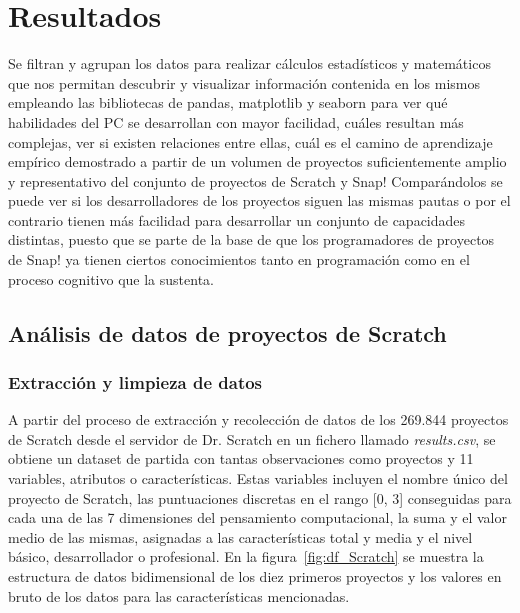 \documentclass[a4paper, 12pt]{book}
\begin{document}

\cleardoublepage
\chapter{Resultados}
\label{chap:resultados}

Se filtran y agrupan los datos para realizar cálculos estadísticos y matemáticos que nos permitan descubrir y visualizar información contenida en los mismos empleando las bibliotecas de pandas, matplotlib y seaborn para ver qué habilidades del PC se desarrollan con mayor facilidad, cuáles resultan más complejas, ver si existen relaciones entre ellas, cuál es el camino de aprendizaje empírico demostrado a partir de un volumen de proyectos suficientemente amplio y representativo del conjunto de proyectos de Scratch y Snap! Comparándolos se puede ver si los desarrolladores de los proyectos siguen las mismas pautas o por el contrario tienen más facilidad para desarrollar un conjunto de capacidades distintas, puesto que se parte de la base de que los programadores de proyectos de Snap! ya tienen ciertos conocimientos tanto en programación como en el proceso cognitivo que la sustenta.

\section{Análisis de datos de proyectos de Scratch} 
\label{sec:result_scratch}

\subsection{Extracción y limpieza de datos}
\label{subsec:clean_data_Scratch}

A partir del proceso de extracción y recolección de datos de los 269.844 proyectos de Scratch desde el servidor de Dr. Scratch en un fichero llamado \emph{results.csv}, se obtiene un dataset de partida con tantas observaciones como proyectos y 11 variables, atributos o características. Estas variables incluyen el nombre único del proyecto de Scratch, las puntuaciones discretas en el rango [0, 3] conseguidas para cada una de las 7 dimensiones del pensamiento computacional, la suma y el valor medio de las mismas, asignadas a las características total y media y el nivel básico, desarrollador o profesional. En la figura~\ref{fig:df_Scratch} se muestra la estructura de datos bidimensional de los diez primeros proyectos y los valores en bruto de los datos para las características mencionadas. 
\end{document}
